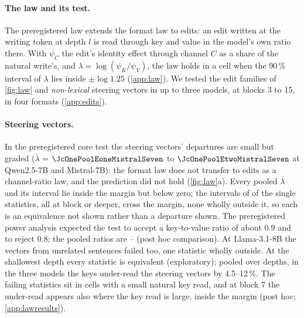 \paragraph{The law and its test.}
The preregistered law extends the format law to edits: an edit written at the writing token at depth $l$ is read through key and value in the model's own ratio there. With $\psi_C$ the edit's identity effect through channel $C$ as a share of the natural write's, and $\lambda = \log(\psi_K/\psi_V)$,\label{eq:lambda} the law holds in a cell when the 90\,\% interval of $\lambda$ lies inside $\pm\log 1.25$ (\cref{app:law}). We tested the edit families of \cref{fig:law} and \emph{non-lexical} steering vectors in up to three models, at blocks 3 to 15, in four formats (\cref{app:edits}).

\paragraph{Steering vectors.}
In the preregistered core test the steering vectors' departures are small but graded ($\bar\lambda$ = $\JcOnePoolEoneMistralSeven$ to $\JcOnePoolEtwoMistralSeven$ at Qwen2.5-7B and Mistral-7B): the format law does not transfer to edits as a channel-ratio law, and the prediction did not hold (\cref{fig:law}a). Every pooled $\bar\lambda$ and its interval lie inside the margin but below zero; the intervals of \JcOneCoreNe{} of the \JcOneCoreN{} single statistics, all at block \JcOneCoreNeDepthMin{} or deeper, cross the margin, none wholly outside it, so each is an equivalence not shown rather than a departure shown. The preregistered power analysis expected the test to accept a key-to-value ratio of about 0.9 and to reject 0.8; the pooled ratios are -- (post hoc comparison). At Llama-3.1-8B the vectors from unrelated sentences failed too, one statistic wholly outside. At the shallowest depth every statistic is equivalent (exploratory); pooled over depths, in the three models the keys under-read the steering vectors by 4.5--12\,\%. The failing statistics sit in cells with a small natural key read, and at block 7 the under-read appears also where the key read is large, inside the margin (post hoc; \cref{app:lawresults}). %

